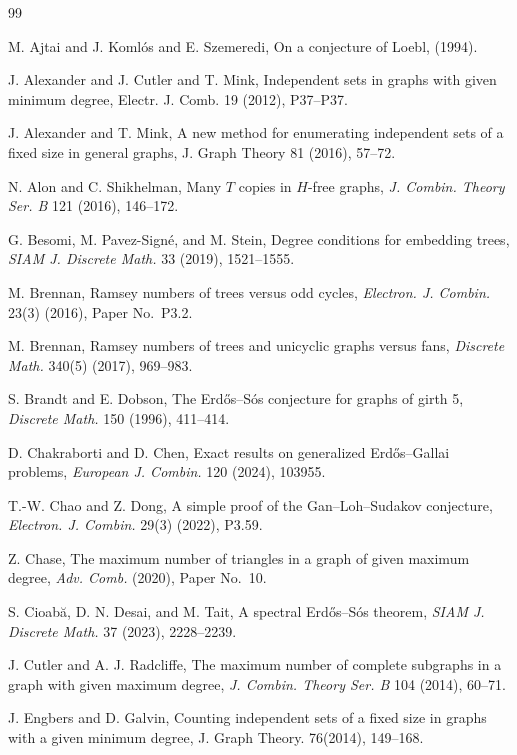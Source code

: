 \documentclass[11pt,a4paper]{article}
\begin{document}
\begin{thebibliography}{99}

 M. Ajtai and J. Koml\'{o}s and E. Szemeredi, On a conjecture of Loebl, (1994).

 J. Alexander and J. Cutler and T. Mink, Independent sets in graphs with given minimum degree, Electr. J. Comb. 19 (2012), P37--P37.

 J. Alexander and T. Mink, A new method for enumerating independent sets of a fixed size in general
 graphs, J. Graph Theory 81 (2016), 57--72.

N. Alon and C. Shikhelman,
Many \(T\) copies in \(H\)-free graphs,
\emph{J. Combin. Theory Ser. B} 121 (2016), 146--172.

G. Besomi, M. Pavez-Sign\'{e}, and M. Stein,
Degree conditions for embedding trees,
\emph{SIAM J. Discrete Math.} 33 (2019), 1521--1555.

M. Brennan,
Ramsey numbers of trees versus odd cycles,
\emph{Electron. J. Combin.} 23(3) (2016), Paper No.~P3.2.

M. Brennan,
Ramsey numbers of trees and unicyclic graphs versus fans,
\emph{Discrete Math.} 340(5) (2017), 969--983.

S. Brandt and E. Dobson,
The Erd\H{o}s--S\'{o}s conjecture for graphs of girth 5,
\emph{Discrete Math.} 150 (1996), 411--414.

D. Chakraborti and D. Chen,
Exact results on generalized Erd\H{o}s--Gallai problems,
\emph{European J. Combin.} 120 (2024), 103955.

T.-W. Chao and Z. Dong,
A simple proof of the Gan--Loh--Sudakov conjecture,
\emph{Electron. J. Combin.} 29(3) (2022), P3.59.

Z. Chase,
The maximum number of triangles in a graph of given maximum degree,
\emph{Adv. Comb.} (2020), Paper No.~10.

S. Cioab\u{a}, D. N. Desai, and M. Tait,
A spectral Erd\H{o}s--S\'{o}s theorem,
\emph{SIAM J. Discrete Math.} 37 (2023), 2228--2239.

J. Cutler and A. J. Radcliffe,
The maximum number of complete subgraphs in a graph with given maximum degree,
\emph{J. Combin. Theory Ser. B} 104 (2014), 60--71.

 J. Engbers and D. Galvin, Counting independent sets of a fixed size in graphs with a given minimum degree, J. Graph Theory. 76(2014), 149--168.


\end{thebibliography}
\end{document}

